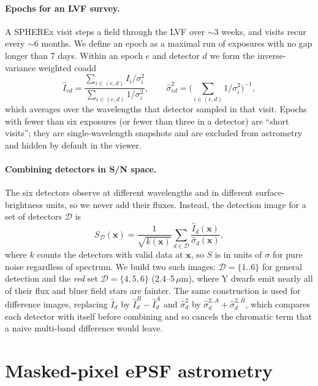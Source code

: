 \documentclass[10pt,twocolumn]{article}
\newcommand{\um}{\ensuremath{\mu\mathrm{m}}}
\newcommand{\SN}{S/N}
\begin{document}
\paragraph{Epochs for an LVF survey.} A SPHEREx visit steps a field through the LVF over $\sim$3 weeks, and
visits recur every $\sim$6 months. We define an epoch as a maximal run of exposures with no gap longer than
7 days. Within an epoch $e$ and detector $d$ we form the inverse-variance weighted coadd
\begin{equation}
  \hat I_{ed} = \frac{\sum_{i\in(e,d)} I_i/\sigma_i^2}{\sum_{i\in(e,d)} 1/\sigma_i^2},
  \qquad
  \hat\sigma^2_{ed} = \Big(\sum_{i\in(e,d)} 1/\sigma_i^2\Big)^{-1},
\end{equation}
which averages over the wavelengths that detector sampled in that visit. Epochs with fewer than six
exposures (or fewer than three in a detector) are ``short visits''; they are single-wavelength snapshots
and are excluded from astrometry and hidden by default in the viewer.

\paragraph{Combining detectors in \SN{} space.} The six detectors observe at different wavelengths and in
different surface-brightness units, so we never add their fluxes. Instead, the detection image for a set of
detectors $\mathcal D$ is
\begin{equation}
  S_{\mathcal D}(\mathbf x) = \frac{1}{\sqrt{k(\mathbf x)}}\sum_{d\in\mathcal D}
      \frac{\hat I_{d}(\mathbf x)}{\hat\sigma_{d}(\mathbf x)},
  \label{eq:snr}
\end{equation}
where $k$ counts the detectors with valid data at $\mathbf x$, so $S$ is in units of $\sigma$ for pure noise
regardless of spectrum. We build two such images: $\mathcal D=\{1..6\}$ for general detection and the
\emph{red} set $\mathcal D=\{4,5,6\}$ (2.4--5\,\um), where Y dwarfs emit nearly all of their flux and
bluer field stars are fainter. The same construction is used for difference images,
replacing $\hat I_d$ by $\hat I^{B}_d-\hat I^{A}_d$ and $\hat\sigma^2_d$ by
$\hat\sigma^{2,A}_d+\hat\sigma^{2,B}_d$, which compares each detector with itself before combining and
so cancels the chromatic term that a naive multi-band difference would leave.

\section{Masked-pixel ePSF astrometry}
\label{sec:astrometry}
\end{document}
